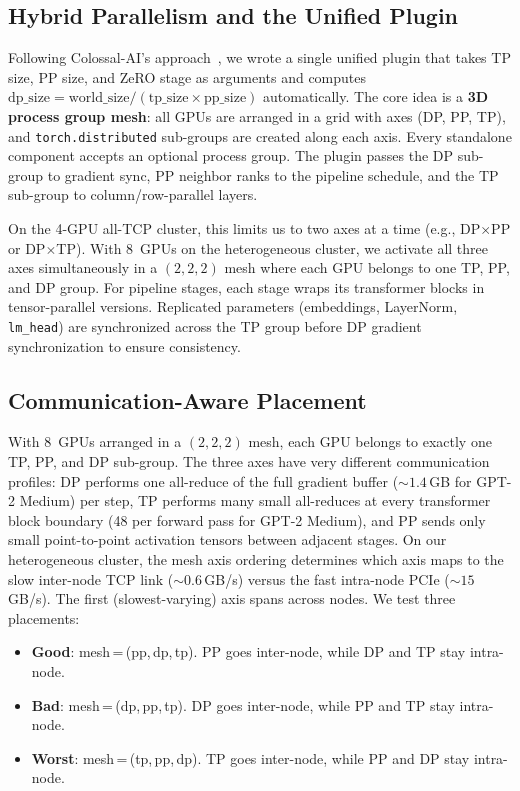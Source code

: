 \documentclass[conference]{IEEEtran}
\begin{document}
\subsection{Hybrid Parallelism and the Unified Plugin}

Following Colossal-AI's approach~\cite{10.1145/3605573.3605613}, we wrote a single unified plugin that takes TP size, PP size, and ZeRO stage as arguments and computes $\text{dp\_size} = \text{world\_size} / (\text{tp\_size} \times \text{pp\_size})$ automatically. The core idea is a \textbf{3D process group mesh}: all GPUs are arranged in a grid with axes (DP, PP, TP), and \texttt{torch.distributed} sub-groups are created along each axis. Every standalone component accepts an optional process group. The plugin passes the DP sub-group to gradient sync, PP neighbor ranks to the pipeline schedule, and the TP sub-group to column/row-parallel layers.

On the 4-GPU all-TCP cluster, this limits us to two axes at a time (e.g., DP$\times$PP or DP$\times$TP). With 8~GPUs on the heterogeneous cluster, we activate all three axes simultaneously in a $(2,2,2)$ mesh where each GPU belongs to one TP, PP, and DP group. For pipeline stages, each stage wraps its transformer blocks in tensor-parallel versions. Replicated parameters (embeddings, LayerNorm, \texttt{lm\_head}) are synchronized across the TP group before DP gradient synchronization to ensure consistency.

\subsection{Communication-Aware Placement}

With 8~GPUs arranged in a $(2,2,2)$ mesh, each GPU belongs to exactly one TP, PP, and DP sub-group. The three axes have very different communication profiles: DP performs one all-reduce of the full gradient buffer (${\sim}1.4$\,GB for GPT-2 Medium) per step, TP performs many small all-reduces at every transformer block boundary (48 per forward pass for GPT-2 Medium), and PP sends only small point-to-point activation tensors between adjacent stages. On our heterogeneous cluster, the mesh axis ordering determines which axis maps to the slow inter-node TCP link (${\sim}0.6$\,GB/s) versus the fast intra-node PCIe (${\sim}15$\,GB/s). The first (slowest-varying) axis spans across nodes. We test three placements:

\begin{itemize}
\item \textbf{Good}: mesh\,=\,(pp,\,dp,\,tp). PP goes inter-node, while DP and TP stay intra-node.
\item \textbf{Bad}: mesh\,=\,(dp,\,pp,\,tp). DP goes inter-node, while PP and TP stay intra-node.
\item \textbf{Worst}: mesh\,=\,(tp,\,pp,\,dp). TP goes inter-node, while PP and DP stay intra-node.
\end{itemize}
\end{document}
